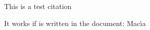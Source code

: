 \documentclass{article}
\begin{document}
	
This is a test citation \parencite{macia2011}

It works if is written in the document: Mac{\'\i}a	
\printbibliography
	
\end{document}
